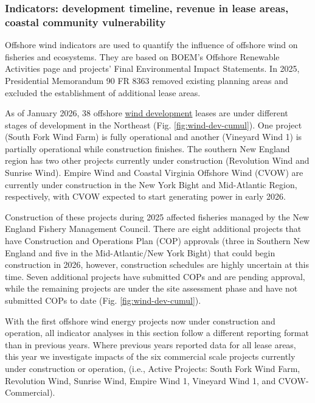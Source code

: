 \documentclass[
  10pt,
]{article}
\begin{document}
\subsubsection{Indicators: development timeline, revenue in lease areas, coastal community vulnerability}\label{indicators-development-timeline-revenue-in-lease-areas-coastal-community-vulnerability}

Offshore wind indicators are used to quantify the influence of offshore wind on fisheries and ecosystems. They are based on BOEM's Offshore Renewable Activities page and projects' Final Environmental Impact Statements. In 2025, Presidential Memorandum 90 FR 8363 removed existing planning areas and excluded the establishment of additional lease areas.

As of January 2026, 38 offshore \href{https://noaa-edab.github.io/catalog/wind_dev_speed.html}{wind development} leases are under different stages of development in the Northeast (Fig. \ref{fig:wind-dev-cumul}). One project (South Fork Wind Farm) is fully operational and another (Vineyard Wind 1) is partially operational while construction finishes. The southern New England region has two other projects currently under construction (Revolution Wind and Sunrise Wind). Empire Wind and Coastal Virginia Offshore Wind (CVOW) are currently under construction in the New York Bight and Mid-Atlantic Region, respectively, with CVOW expected to start generating power in early 2026.

Construction of these projects during 2025 affected fisheries managed by the New England Fishery Management Council. There are eight additional projects that have Construction and Operations Plan (COP) approvals (three in Southern New England and five in the Mid-Atlantic/New York Bight) that could begin construction in 2026, however, construction schedules are highly uncertain at this time. Seven additional projects have submitted COPs and are pending approval, while the remaining projects are under the site assessment phase and have not submitted COPs to date (Fig. \ref{fig:wind-dev-cumul}).

With the first offshore wind energy projects now under construction and operation, all indicator analyses in this section follow a different reporting format than in previous years. Where previous years reported data for all lease areas, this year we investigate impacts of the six commercial scale projects currently under construction or operation, (i.e., Active Projects: South Fork Wind Farm, Revolution Wind, Sunrise Wind, Empire Wind 1, Vineyard Wind 1, and CVOW-Commercial).
\end{document}
